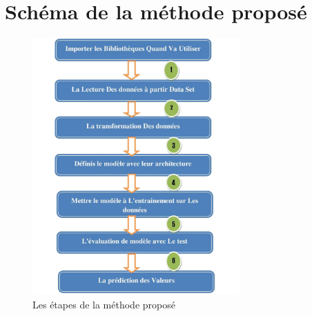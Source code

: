 \documentclass[12pt]{report}
\begin{document}
\section{Schéma de la méthode proposé}
\begin{figure}[h]
\begin{center}
\includegraphics[width=300]{demarche.jpg}
\caption{Les étapes de la méthode proposé}
\end{center}
\end{figure}




\newpage 
\end{document}

